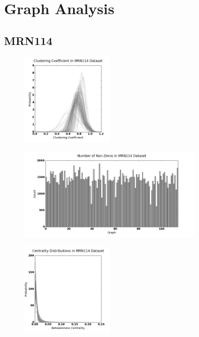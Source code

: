 \appendix
\chapter{Graph Analysis}
\label{app:graphs}

\section{MRN114}
\begin{figure}[h!]
\centering
\includegraphics[width=0.4\textwidth]{./stats/MRN114-cc.png}
\end{figure}

\begin{figure}[h!]
\centering
\includegraphics[width=0.8\textwidth]{./stats/MRN114-nnz.png}
\end{figure}

\begin{figure}[h!]
\centering
\includegraphics[width=0.4\textwidth]{./stats/MRN114-centrality.png}
\end{figure}


